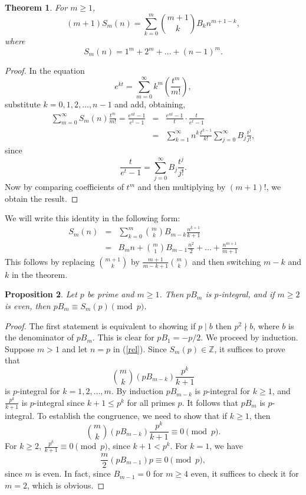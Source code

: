\documentclass[12pt]{article}
\newtheorem{theorem}{Theorem}[section]
\newtheorem{proof}{Proof}
\newtheorem{proposition}[theorem]{Proposition}
\begin{document}
\begin{theorem}
For $m \geq 1$, 
$$
(m+1) S_m(n) = \sum_{k=0}^{m} \binom{m+1}{k} B_k n^{m+1-k},
$$
where
$$
S_m(n) = 1^m + 2^m + \ldots + (n-1)^m.
$$
\end{theorem}
\begin{proof}
In the equation
$$
e^{kt} = \sum_{m=0}^{\infty} k^m \left( \frac{t^m}{m!} \right),
$$
substitute $k = 0, 1, 2, \ldots, n-1$ and add, obtaining,
\begin{eqnarray*}
\sum_{m=0}^{\infty} S_m(n) \frac{t^m}{m!} = \frac{e^{nt}-1}{e^t-1} &=& \frac{e^{nt}-1}{t} \cdot \frac{t}{e^t-1} \\
						  &=& \sum_{k=1}^{\infty} n^k \frac{t^{k-1}}{k!} 							   \sum_{j=0}^{\infty} B_j \frac{t^j}{j!},
\end{eqnarray*}
since
$$
\frac{t}{e^t-1} = \sum_{j=0}^{\infty} B_j \frac{t^j}{j!}.
$$
Now by comparing coefficients of $t^m$ and then multiplying by $(m+1)!$, we obtain the result.
\end{proof}
We will write this identity in the following form:
\begin{eqnarray}
S_m(n) &=& \sum_{k=0}^m \binom{m}{k} B_{m-k} \frac{n^{k+1}}{k+1} \\
&=& \label{rel}
B_m n + \binom{m}{1} B_{m-1} \frac{n^2}{2} + \ldots + \frac{n^{m+1}}{m+1}
\end{eqnarray}
This follows by replacing $\binom{m+1}{k}$ by $\frac{m+1}{m-k+1} \binom{m}{k}$ and then switching $m-k$ and $k$ in the theorem.

\begin{proposition}
Let $p$ be prime and $m \geq 1$. Then $p B_m$ is $p$-integral, and if $m \geq 2$ is even, then $p B_m \equiv S_m(p) \pmod{p}$.
\end{proposition}
\begin{proof}
The first statement is equivalent to showing if $p \mid b$ then $p^2 \nmid b$, where $b$ is the denominator of $p B_m$. This is clear for $p B_1 = -p/2$. We proceed by induction. Suppose $m > 1$ and let $n=p$ in (\ref{rel}). Since $S_m(p) \in \mathbb{Z}$, it suffices to prove that
$$
\binom{m}{k} (p B_{m-k}) \frac{p^k}{k+1}
$$
is $p$-integral for $k = 1, 2, \ldots, m$. By induction $p B_{m-k} $ is $p$-integral for $k \geq 1$, and $\frac{p^k}{k+1}$ is $p$-integral since $k+1 \leq p^k$ for all primes $p$. It follows that $p B_m$ is $p$-integral.
To establish the congruence, we need to show that if $k \geq 1$, then
$$
\binom{m}{k} (p B_{m-k}) \frac{p^k}{k+1} \equiv 0 \pmod{p}.
$$
For $k \geq 2$, $\frac{p^k}{k+1} \equiv 0 \pmod{p}$, since $k+1 < p^k$.
For $k=1$, we have 
$$
\frac{m}{2} (p B_{m-1}) p \equiv 0 \pmod{p},
$$
since $m$ is even. In fact, since $B_{m-1} = 0$ for $m \geq 4$ even, it suffices to check it for $m=2$, which is obvious.
\end{proof}
\end{document}
